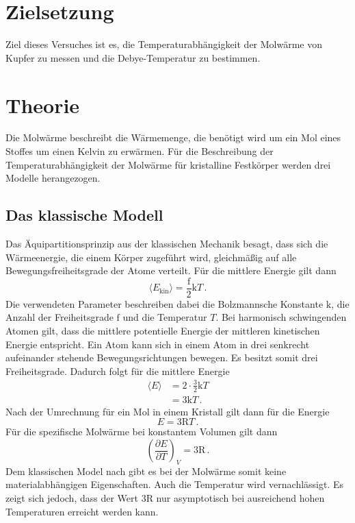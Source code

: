 \section{Zielsetzung}
Ziel dieses Versuches ist es, die Temperaturabhängigkeit der Molwärme von Kupfer
zu messen und die Debye-Temperatur zu bestimmen.
\section{Theorie}
Die Molwärme beschreibt die Wärmemenge, die benötigt wird um ein Mol eines
Stoffes um einen Kelvin zu erwärmen. Für die Beschreibung der
Temperaturabhängigkeit der Molwärme für kristalline Festkörper
werden drei Modelle herangezogen.

\subsection{Das klassische Modell}
Das Äquipartitionsprinzip aus der klassischen Mechanik besagt, dass sich die
Wärmeenergie, die einem Körper zugeführt wird, gleichmäßig auf alle
Bewegungsfreiheitsgrade der Atome verteilt. Für die mittlere Energie gilt dann
\begin{equation}
  \langle E_{\text{kin}} \rangle = \frac{\text{f}}{2} \text{k} T \, .
\end{equation}
Die verwendeten Parameter beschreiben dabei die Bolzmannsche Konstante
$\text{k}$, die Anzahl der Freiheitsgrade $\text{f}$ und die Temperatur $T$. Bei
harmonisch schwingenden Atomen gilt, dass die mittlere potentielle Energie
der mittleren kinetischen Energie entspricht. Ein Atom kann sich in einem
Atom in drei senkrecht aufeinander stehende Bewegungsrichtungen bewegen. Es
besitzt somit drei Freiheitsgrade. Dadurch folgt für die mittlere Energie
\begin{align*}
  \langle E \rangle &= 2 \cdot \frac{3}{2} \text{k} T \\
                    &= 3 \text{k} T  \, .
\end{align*}
Nach der Umrechnung für ein Mol in einem Kristall gilt dann für die Energie
\begin{equation}
  E = 3 \text{R} T \, .
\end{equation}
Für die spezifische Molwärme bei konstantem Volumen gilt dann
\begin{equation}
  \left(\frac{\partial E}{\partial T}\right)_{\!\! V} = 3 \text{R} \, .
\end{equation}
Dem klassischen Model nach gibt es bei der Molwärme somit keine
materialabhängigen Eigenschaften. Auch die Temperatur wird vernachlässigt.
Es zeigt sich jedoch, dass der Wert $3 \text{R}$ nur asymptotisch bei
ausreichend hohen Temperaturen erreicht werden kann.

